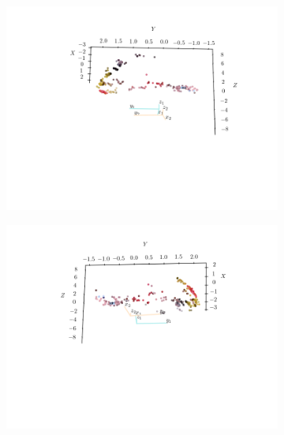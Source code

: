 \begin{homeworkProblem}
\begin{figure}[H]
\begin{subfigure}{0.49\textwidth}
          \includegraphics[width=1.3\linewidth]{images/ang_3.png}
      \end{subfigure}
      \begin{subfigure}{0.49\textwidth}
          \includegraphics[width=1.3\linewidth]{./images/ang_4.png}
      \end{subfigure}
      \begin{subfigure}{0.49\textwidth}

\end{subfigure}
\end{figure}
\end{homeworkProblem}
